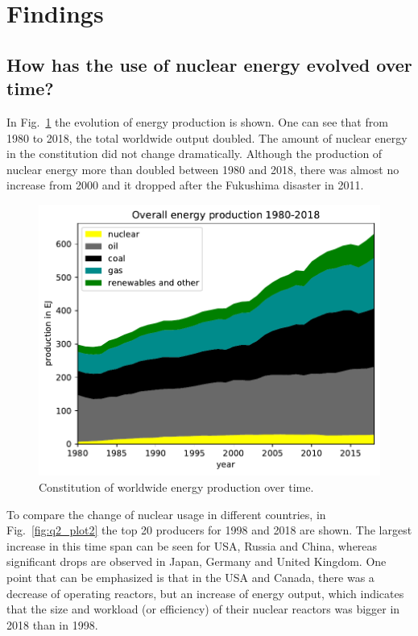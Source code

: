 \documentclass[a4paper,10pt,twocolumn]{scrartcl}
\begin{document}
\section{Findings}

\subsection{How has the use of nuclear energy evolved over time?}

In Fig.~\ref{fig:q1_plot1} the evolution of energy production is shown. One can see that from 1980 to 2018, the total worldwide output doubled. The amount of nuclear energy in the constitution did not change dramatically. Although the production of nuclear energy more than doubled between 1980 and 2018, there was almost no increase from 2000 and it dropped after the Fukushima disaster in 2011.

\begin{figure}[h]
	\centering
 	\includegraphics[width=\columnwidth]{../figures/q1_plot1.pdf}
 	\caption{Constitution of worldwide energy production over time.}
 	\label{fig:q1_plot1}
\end{figure}

To compare the change of nuclear usage in different countries, in Fig.~\ref{fig:q2_plot2} the top 20 producers for 1998 and 2018 are shown. The largest increase in this time span can be seen for USA, Russia and China, whereas significant drops are observed in Japan, Germany and United Kingdom. One point that can be emphasized is that in the USA and Canada, there was a decrease of operating reactors, but an increase of energy output, which indicates that the size and workload (or efficiency) of their nuclear reactors was bigger in 2018 than in 1998.
\end{document}
